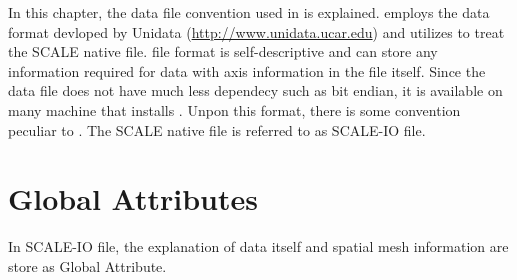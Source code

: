 In this chapter,
the data file convention used in \scalelib is explained.
\scalelib employs the data format devloped by Unidata
(\url{http://www.unidata.ucar.edu}) and utilizes \netcdf to
treat the SCALE native file.
\netcdf file format is self-descriptive and
can store any information required for data
with axis information in the file itself.
Since the data file does not have much less dependecy such as bit endian,
it is available on many machine that installs \netcdf. 
Unpon this format, there is some  convention peculiar to \scalelib.
The SCALE native file is referred to as SCALE-IO file.

\section{Global Attributes} 
In SCALE-IO file,
the explanation of data itself and spatial mesh information
are store as Global Attribute.
